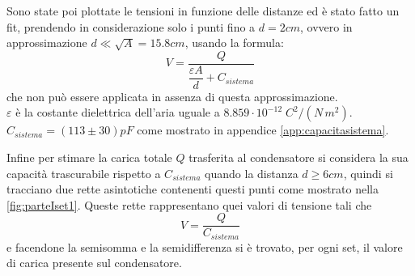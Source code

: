 {Sono state poi plottate le tensioni in funzione delle distanze ed è stato fatto un fit, prendendo in considerazione solo i punti fino a $d = 2 cm$, ovvero in approssimazione $d \ll \sqrt{A} = 15.8 cm$, usando la formula: 
\begin{equation*}
    V = \dfrac{Q}{\dfrac{\varepsilon A}{d} + C_{sistema}}
\end{equation*} 
che non può essere applicata in assenza di questa approssimazione.
\\
$\varepsilon$ è la costante dielettrica dell'aria uguale a $8.859 \cdot 10^{-12} \; C^2/(N \, m^2)$.
\\
$C_{sistema} = (113 \pm 30) pF$ come mostrato in appendice \ref{app:capacitasistema}.

Infine per stimare la carica totale $Q$ trasferita al condensatore si considera la sua capacità trascurabile rispetto a $C_{sistema}$ quando la distanza $d \geq 6 cm$, quindi si tracciano due rette asintotiche contenenti questi punti come mostrato nella \autoref{fig:parteIset1}. Queste rette rappresentano quei valori di tensione tali che 
\begin{equation*}
    V = \dfrac{Q}{C_{sistema}} 
\end{equation*}
e facendone la semisomma e la semidifferenza si è trovato, per ogni set, il valore di carica presente sul condensatore.

\par}